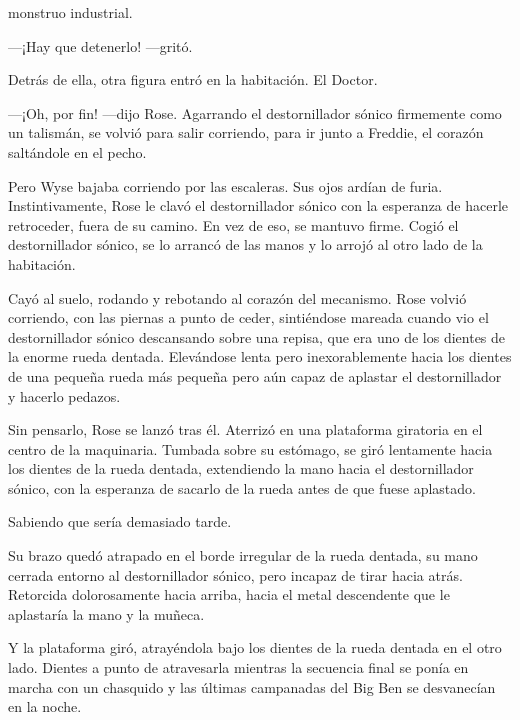 {monstruo industrial.}

{---¡Hay que detenerlo! ---gritó.}

{Detrás de ella, otra figura entró en la habitación. El Doctor.}

{---¡Oh, por fin! ---dijo Rose. Agarrando el destornillador sónico
	firmemente como un talismán, se volvió para salir corriendo, para ir
junto a Freddie, el corazón saltándole en el pecho.}

{Pero Wyse bajaba corriendo por las escaleras. Sus ojos ardían de furia.
	Instintivamente, Rose le clavó el destornillador sónico con la esperanza
	de hacerle retroceder, fuera de su camino. En vez de eso, se mantuvo
	firme. Cogió el destornillador sónico, se lo arrancó de las manos y lo
arrojó al otro lado de la habitación.}

{Cayó al suelo, rodando y rebotando al corazón del mecanismo. Rose
	volvió corriendo, con las piernas a punto de ceder, sintiéndose mareada
	cuando vio el destornillador sónico descansando sobre una repisa, que
	era uno de los dientes de la enorme rueda dentada. Elevándose lenta pero
	inexorablemente hacia los dientes de una pequeña rueda más pequeña pero
aún capaz de aplastar el destornillador y hacerlo pedazos.}

{Sin pensarlo, Rose se lanzó tras él. Aterrizó en una plataforma
	giratoria en el centro de la maquinaria. Tumbada sobre su estómago, se
	giró lentamente hacia los dientes de la rueda dentada, extendiendo la
	mano hacia el destornillador sónico, con la esperanza de sacarlo de la
rueda antes de que fuese aplastado.}

{Sabiendo que sería demasiado tarde.}

{Su brazo quedó atrapado en el borde irregular de la rueda dentada, su
	mano cerrada entorno al destornillador sónico, pero incapaz de tirar
	hacia atrás. Retorcida dolorosamente hacia arriba, hacia el metal
descendente que le aplastaría la mano y la muñeca.}

{Y la plataforma giró, atrayéndola bajo los dientes de la rueda dentada
	en el otro lado. Dientes a punto de atravesarla mientras la secuencia
	final se ponía en marcha con un chasquido y las últimas campanadas del
Big Ben se desvanecían en la noche.}
